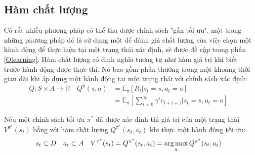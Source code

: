 \subsection{Hàm chất lượng}
Có rất nhiều phương pháp có thể thu được chính sách "gần tối ưu", một trong những phương pháp đó là sử dụng một \cite{RLSuttonBook} để đánh giá chất lượng của việc chọn một hành động để thực hiện tại một trạng thái xác định, sẽ được đề cập trong phần \ref{Qlearning}. Hàm chất lượng có định nghĩa tương tự như hàm giá trị khi biết trước hành động được thực thi. Nó bao gồm phần thưởng trong một khoảng thời gian dài khi áp dụng một hành động tại một trạng thái với chính sách xác định\cite{RLSuttonBook}:
\begin{align}
    \nonumber
    Q:S\times A \longrightarrow \mathbb{R}\quad Q^\pi(s,a)&=\mathbb{E}_\pi[R_t|s_t=s, a_t=a]\\
    &=\mathbb{E}_\pi\left[\sum^\infty_{i=0}\gamma^ir_{t+i+1}\Big| s_t=s, a_t=a\right]
\end{align}

Nếu một chính sách tối ưu $\pi^*$ đã được xác định thì giá trị của một trạng thái $V^{\pi^*}(s_t)$ bằng với hàm chất lượng $Q^{\pi^*}(s_t,a_t)$ khi thực một hành động tối ưu\cite{RLSuttonBook}:
\begin{equation}\label{Q-function}
    s_t\subset D \quad a_t \subset A \quad V^{\pi^*} (s_t)=Q^{\pi^*}(s_t,a_t) = \operatorname*{arg\,max}_aQ^{\pi^*}(s_t,a_t)
\end{equation}
\vspace{1cm}
